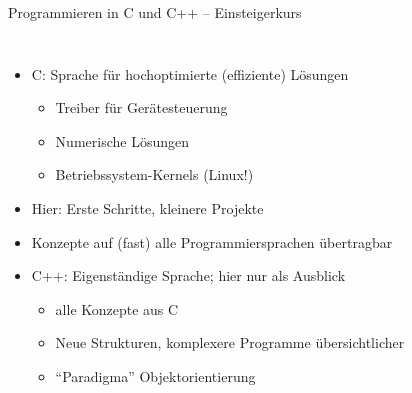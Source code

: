 
\begin{frame}[t,plain]
\titlepage
\end{frame}


\begin{frame}{Programmieren in C und C++ -- Einsteigerkurs}
%
\begin{columns}[T]
\begin{itemize}
\item C: Sprache für hochoptimierte (effiziente) Lösungen
	\begin{itemize}
	\item Treiber für Gerätesteuerung
	\item Numerische Lösungen
	\item Betriebssystem-Kernels (\zB Linux!)
	\end{itemize}
\item Hier: Erste Schritte, kleinere Projekte
\item Konzepte auf (fast) alle Programmiersprachen übertragbar
\item C++: Eigenständige Sprache; hier nur als Ausblick
	\begin{itemize}
	\item alle Konzepte aus C
	\item Neue Strukturen, komplexere Programme übersichtlicher
	\item \enquote{Paradigma} Objektorientierung
	\end{itemize}
\end{itemize}

\end{columns}
\end{frame}
